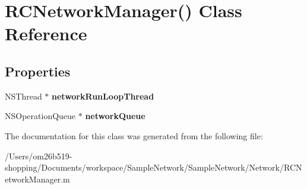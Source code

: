 \hypertarget{interface_r_c_network_manager_07_08}{\section{R\-C\-Network\-Manager() Class Reference}
\label{interface_r_c_network_manager_07_08}
}
\subsection*{Properties}
\begin{DoxyCompactItemize}
\item 
\hypertarget{interface_r_c_network_manager_07_08_a11e826475ef349d7e922c299b7329761}{N\-S\-Thread $\ast$ {\bfseries network\-Run\-Loop\-Thread}}\label{interface_r_c_network_manager_07_08_a11e826475ef349d7e922c299b7329761}

\item 
\hypertarget{interface_r_c_network_manager_07_08_afebfa9d48260adccf7b4e8d7789736c4}{N\-S\-Operation\-Queue $\ast$ {\bfseries network\-Queue}}\label{interface_r_c_network_manager_07_08_afebfa9d48260adccf7b4e8d7789736c4}

\end{DoxyCompactItemize}


The documentation for this class was generated from the following file\-:\begin{DoxyCompactItemize}
\item 
/\-Users/om26b519-\/shopping/\-Documents/workspace/\-Sample\-Network/\-Sample\-Network/\-Network/R\-C\-Network\-Manager.\-m\end{DoxyCompactItemize}
